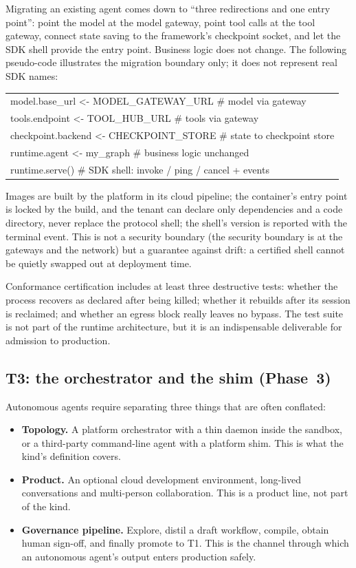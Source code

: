 Migrating an existing agent comes down to ``three redirections and one entry point'': point the model at the model gateway, point tool calls at the tool gateway, connect state saving to the framework's checkpoint socket, and let the SDK shell provide the entry point. Business logic does not change. The following pseudo-code illustrates the migration boundary only; it does not represent real SDK names:

\begin{codebox}
\begin{tabular}{@{}l@{}}
model.base\_url      <- MODEL\_GATEWAY\_URL      \# model via gateway\\
tools.endpoint      <- TOOL\_HUB\_URL           \# tools via gateway\\
checkpoint.backend  <- CHECKPOINT\_STORE       \# state to checkpoint store\\
runtime.agent       <- my\_graph               \# business logic unchanged\\
runtime.serve()     \# SDK shell: invoke / ping / cancel + events
\end{tabular}
\end{codebox}

Images are built by the platform in its cloud pipeline; the container's entry point is locked by the build, and the tenant can declare only dependencies and a code directory, never replace the protocol shell; the shell's version is reported with the terminal event. This is not a security boundary (the security boundary is at the gateways and the network) but a guarantee against drift: a certified shell cannot be quietly swapped out at deployment time.

Conformance certification includes at least three destructive tests: whether the process recovers as declared after being killed; whether it rebuilds after its session is reclaimed; and whether an egress block really leaves no bypass. The test suite is not part of the runtime architecture, but it is an indispensable deliverable for admission to production.

\subsection{T3: the orchestrator and the shim (Phase~3)}

Autonomous agents require separating three things that are often conflated:

\begin{itemize}
  \item \textbf{Topology.} A platform orchestrator with a thin daemon inside the sandbox, or a third-party command-line agent with a platform shim. This is what the kind's definition covers.
  \item \textbf{Product.} An optional cloud development environment, long-lived conversations and multi-person collaboration. This is a product line, not part of the kind.
  \item \textbf{Governance pipeline.} Explore, distil a draft workflow, compile, obtain human sign-off, and finally promote to T1. This is the channel through which an autonomous agent's output enters production safely.
\end{itemize}

